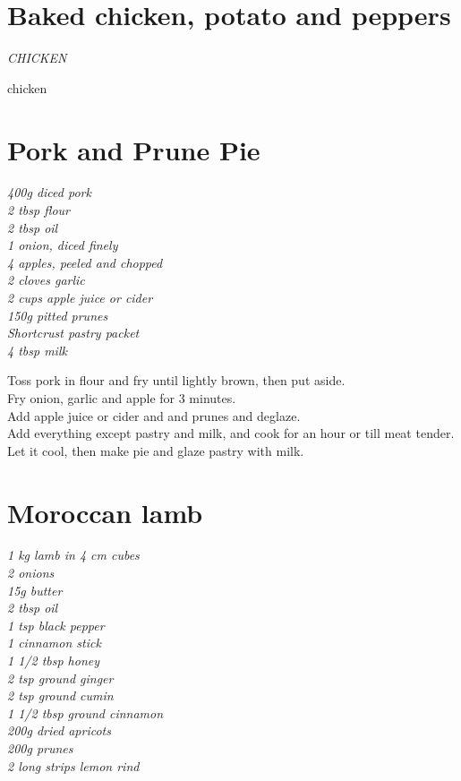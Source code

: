 \documentclass{tufte-book}
\begin{document}

\section{Baked chicken, potato and peppers}

\emph{CHICKEN}



chicken


\section{Pork and Prune Pie}

\emph{400g diced pork
\\2 tbsp flour
\\2 tbsp oil
\\1 onion, diced finely
\\4 apples, peeled and chopped
\\2 cloves garlic
\\2 cups apple juice or cider
\\150g pitted prunes
\\Shortcrust pastry packet
\\4 tbsp milk}

Toss pork in flour and fry until lightly brown, then put aside.
\\Fry onion, garlic and apple for 3 minutes.
\\Add apple juice or cider and and prunes and deglaze.
\\Add everything except pastry and milk,  and cook for an hour or till meat tender.
\\Let it cool, then make pie and glaze pastry with milk.


\section{Moroccan lamb}

\emph{1 kg lamb in 4 cm cubes
\\2 onions
\\15g butter
\\2 tbsp oil
\\1 tsp black pepper
\\1 cinnamon stick
\\1 1/2 tbsp honey
\\2 tsp ground ginger
\\2 tsp ground cumin
\\1 1/2 tbsp ground cinnamon
\\200g dried apricots
\\200g prunes
\\2 long strips lemon rind}
\end{document}
